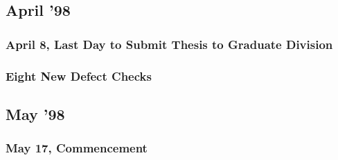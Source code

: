 \subsection{April '98}
\subsubsection{April 8, Last Day to Submit Thesis to Graduate Division}
\subsubsection{Eight New Defect Checks}

\subsection{May '98}
\subsubsection{May 17, Commencement}










